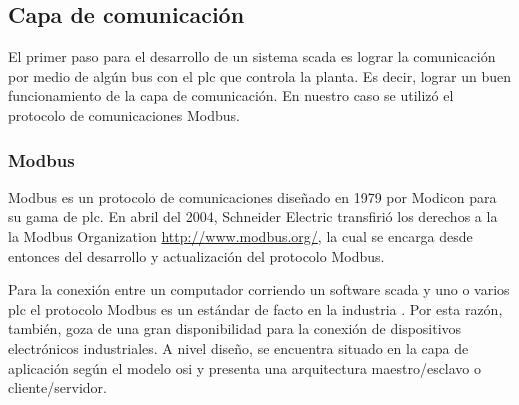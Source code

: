 \subsection{Capa de comunicación}
\label{subsec:CapaComunicacion}
El primer paso para el desarrollo de un sistema \gls{scada} es lograr la 
comunicación por medio de algún bus con el \gls{plc} que controla la planta. Es 
decir, lograr un buen funcionamiento de la capa de comunicación. En nuestro caso 
se utilizó el protocolo de comunicaciones Modbus. 

\subsubsection{Modbus}
Modbus es un protocolo de comunicaciones diseñado en 1979 por Modicon para su 
gama de \gls{plc}. En abril del 2004, Schneider Electric transfirió los 
derechos a la la Modbus Organization \url{http://www.modbus.org/}, la cual se 
encarga desde entonces del desarrollo y actualización del protocolo Modbus.

Para la conexión entre un computador corriendo un software \gls{scada} y uno o 
varios \gls{plc} el protocolo Modbus es un estándar de facto en la industria . 
Por esta razón, también, goza de una gran disponibilidad para la conexión de 
dispositivos electrónicos industriales. A nivel diseño, se encuentra situado en 
la capa de aplicación según el modelo \gls{osi} y presenta una arquitectura 
maestro/esclavo o cliente/servidor.



